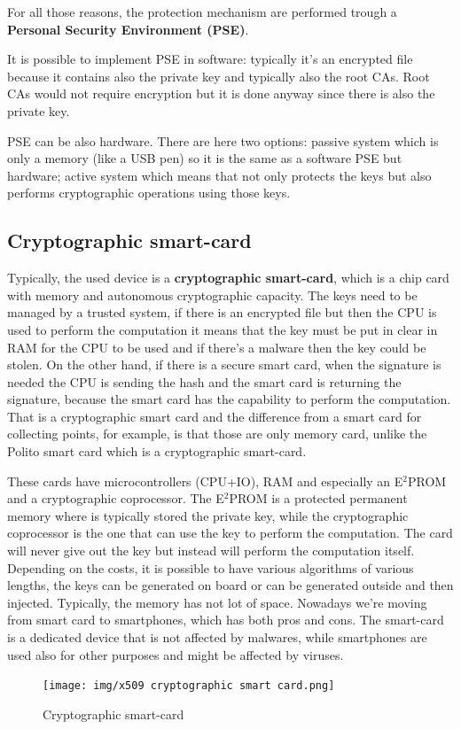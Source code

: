 For all those reasons, the protection mechanism are performed trough a 
\textbf{Personal Security Environment (PSE)}.

It is possible to implement PSE in software: typically it’s an
encrypted file because it contains also the private key and typically
also the root CAs. Root CAs would not require encryption but it is
done anyway since there is also the private key.

PSE can be also hardware. There are here two options: passive system
which is only a memory (like a USB pen) so it is the same as a
software PSE but hardware; active system which means that not only
protects the keys but also performs cryptographic operations using
those keys.
\subsection{Cryptographic smart-card}
Typically, the used device is a \textbf{cryptographic smart-card},
which is a chip card with memory and autonomous cryptographic
capacity. The keys need to be managed by a trusted system, if there is
an encrypted file but then the CPU is used to perform the computation
it means that the key must be put in clear in RAM for the CPU to be
used and if there’s a malware then the key could be stolen. On the
other hand, if there is a secure smart card, when the signature is
needed the CPU is sending the hash and the smart card is returning the
signature, because the smart card has the capability to perform the
computation. That is a cryptographic smart card and the difference
from a smart card for collecting points, for example, is that those
are only memory card, unlike the Polito smart card which is a
cryptographic smart-card.

These cards have microcontrollers (CPU+IO), RAM and especially an
E$^2$PROM and a cryptographic coprocessor. The E$^2$PROM is a
protected permanent memory where is typically stored the private key,
while the cryptographic coprocessor is the one that can use the key to
perform the computation. The card will never give out the key but
instead will perform the computation itself. Depending on the costs,
it is possible to have various algorithms of various lengths, the keys
can be generated on board or can be generated outside and then
injected. Typically, the memory has not lot of space. Nowadays we’re
moving from smart card to smartphones, which has both pros and cons.
The smart-card is a dedicated device that is not affected by malwares,
while smartphones are used also for other purposes and might be
affected by viruses.
\begin{figure}[H]
  \centering
  \texttt{[image: img/x509 cryptographic smart
  card.png]}
  \label{fig:smart-card}

  \caption{Cryptographic smart-card}
\end{figure}

